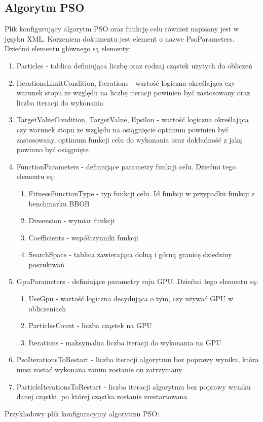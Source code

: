 \documentclass[12pt, twoside, openany, abstract=on]{report}
\theoremstyle{definition}
\begin{document}
\subsection{Algorytm PSO}
Plik konfigurujący algorytm PSO oraz funkcję celu również napisany jest w języku XML. Korzeniem dokumentu jest element o nazwe PsoParameters. 
Dziećmi elementu głównego są elementy:
\begin{enumerate}
	\item Particles - tablica definiująca liczbę oraz rodzaj cząstek użytych do obliczeń
	\item IterationsLimitCondition, Iterations - wartość logiczna określająca czy warunek stopu ze względu na liczbę iteracji powinien być zastosowany oraz liczba iteracji do wykonania
	\item TargetValueCondition, TargetValue, Epsilon - wartość logiczna określająca czy warunek stopu ze względu na osiągnięcie optimum powinien być zastosowany, optimum funkcji celu do wykonania oraz dokładność z jaką powinno być osiągnięte
	\item FunctionParameters - definiujące parametry funkcji celu. Dziećmi tego elementu są:
	\begin{enumerate}
		\item FitnessFunctionType - typ funkcji celu. Id funkcji w przypadku funkcji z benchmarku BBOB
		\item Dimension - wymiar funkcji
		\item Coefficients - współczynniki funkcji
		\item SearchSpace - tablica zawierająca dolną i górną granicę dziedziny poszukiwań
	\end{enumerate}
	\item GpuParameters - definiujące parametry roju GPU. Dziećmi tego elementu są:
	\begin{enumerate}
		\item UseGpu - wartość logiczna decydująca o tym, czy używać GPU w obliczeniach
		\item ParticlesCount - liczba cząstek na GPU
		\item Iterations - maksymalna liczba iteracji do wykonania na GPU
	\end{enumerate}
	\item PsoIterationsToRestart - liczba iteracji algorytmu bez poprawy wyniku, która musi zostać wykonana zanim zostanie on zatrzymany
	\item ParticleIterationsToRestart - liczba iteracji algorytmu bez poprawy wyniku danej cząstki, po której cząstka zostanie zrestartowana

\end{enumerate}
\clearpage
Przykładowy plik konfiguracyjny algorytmu PSO:
\end{document}
